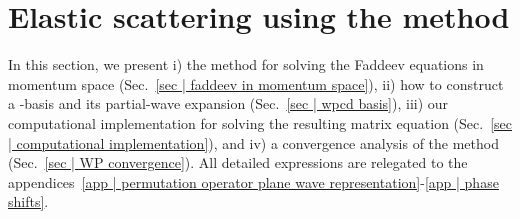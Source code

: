 \documentclass[aps,prc,showpacs,twocolumn,floatfix,nobibnotes,nofootinbib,amsmath,amssymb,longbibliography]{revtex4-2}
\begin{document}
\section{Elastic \Nd{} scattering using the \wpcd{} method}
\label{sec | elastic nd scattering}

In this section, we present i) the \wpcd{} method for solving the
\Nd{} Faddeev equations in momentum space (Sec.~\ref{sec | faddeev in
  momentum space}), ii) how to construct a \wpcd-basis and its
partial-wave expansion (Sec.~\ref{sec | wpcd basis}), iii) our
computational implementation for solving the resulting matrix equation
(Sec.~\ref{sec | computational implementation}), and iv) a convergence
analysis of the \wpcd{} method (Sec.~\ref{sec | WP convergence}). All
detailed expressions are relegated to the appendices~\ref{app |
  permutation operator plane wave representation}-\ref{app | phase
  shifts}.
\end{document}

